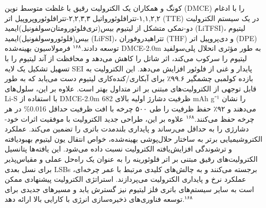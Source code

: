 \documentclass[12pt,a4paper,twocolumn]{article} %
\newcommand{\persian}[1]{\textfarsi{#1}}
\newcommand{\english}[1]{\textenglish{#1}}
\begin{document}
\persian{
کونگ و همکاران یک الکترولیت رقیق با غلظت متوسط نوین (\english{DMCE}) را با ادغام ۱,۱,۲,۲-تترافلوئورواتیل ۲,۲,۳,۳-تترافلوئوروپروپیل اتر (\english{TTE}) در یک سیستم الکترولیت دو-نمکی متشکل از لیتیوم بیس(تری‌فلوئورومتان‌سولفونیل)ایمید (\english{LiTFSI})، لیتیوم بیس(فلوئوروسولفونیل)ایمید (\english{LiFSI})، تتراهیدروفوران (\english{THF}) و دی‌پروپیل اتر (\english{DPE}) توسعه دادند.$^{۱۶۸}$ فرمولاسیون بهینه‌شده \english{DMCE-2.0m} به طور مؤثری انحلال پلی‌سولفید لیتیوم را سرکوب می‌کند، اثر شاتل را کاهش می‌دهد و محافظت از آند لیتیوم را با تسهیل تشکیل یک لایه \english{SEI} پایدار و غنی از فلوئور افزایش می‌دهد. این الکترولیت به بازده کولمبی چشمگیر ۹۹.۶٪ برای آبکاری/کنده‌کاری لیتیوم دست می‌یابد که به طور قابل توجهی از الکترولیت‌های مبتنی بر اتر متداول بهتر است. علاوه بر این، سلول‌های \english{Li-S} با استفاده از \english{DMCE-2.0m} ظرفیت دشارژ اولیه بالای \english{682 mAh g⁻¹} را نشان می‌دهند و ۹۲٪ حفظ ظرفیت را طی ۵۰۰ چرخه با افت ظرفیت حداقل \english{0.016\%} در هر چرخه حفظ می‌کنند.$^{۱۶۸}$ علاوه بر این، طراحی جدید الکترولیت با موفقیت اثرات خود-دشارژی را به حداقل می‌رساند و پایداری بلندمدت باتری را تضمین می‌کند. عملکرد الکتروشیمیایی برتر به ساختار حلال‌پوشی بهینه‌شده، خواص انتقال یون لیتیوم بهبودیافته و ترشوندگی افزایش‌یافته الکترولیت نسبت داده می‌شود. این یافته‌ها پتانسیل الکترولیت‌های رقیق مبتنی بر اتر فلوئورینه را به عنوان یک راه‌حل عملی و مقیاس‌پذیر برای نسل بعدی \english{LSBs} برجسته می‌کنند و به چالش‌های کلیدی مرتبط با عمر چرخه‌ای، عملکرد نرخ و پایداری الکترولیت می‌پردازند. استراتژی الکترولیت پیشنهادی ممکن است به سایر سیستم‌های باتری فلز لیتیوم نیز گسترش یابد و مسیرهای جدیدی برای توسعه فناوری‌های ذخیره‌سازی انرژی با کارایی بالا ارائه دهد.$^{۱۶۸}$
}
\end{document}
